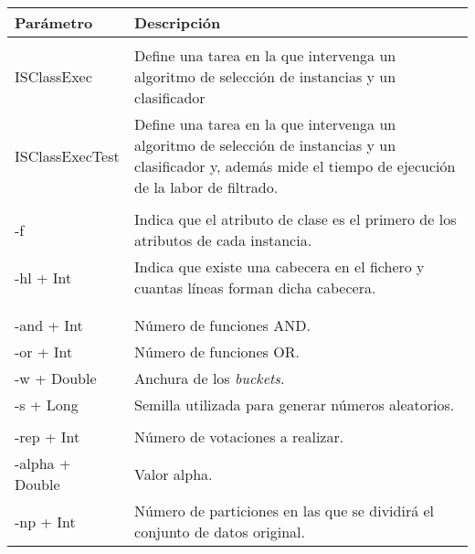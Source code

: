  \begin{table}
  \begin{center}
   \begin{tabular}{| m{3cm} | L{9cm} |}
    \hline
    \centering Parámetro &  Descripción \\
    \hline
     \\
    \hline
   	\centering ISClassExec & Define una tarea en la que intervenga un algoritmo de selección de instancias y un clasificador \\
   	\hline
   	\centering ISClassExecTest & Define una tarea en la que intervenga un algoritmo de selección de instancias y un clasificador y, además mide el tiempo de ejecución de la labor de filtrado.\\
   	\hline
   	 \\
   	\hline
   	\centering -f & Indica que el atributo de clase es el primero de los atributos de cada instancia.\\
   	\hline
   	\centering -hl + Int & Indica que existe una cabecera en el fichero y cuantas líneas forman dicha cabecera. \\
   	\hline
   	 \\
   	\hline
   	 \\
   	\hline
   	\centering -and + Int & Número de funciones AND.\\
   	\hline
   	\centering -or + Int & Número de funciones OR.\\
   	\hline
   	\centering -w + Double & Anchura de los \textit{buckets}.\\
   	\hline
   	\centering -s + Long & Semilla utilizada para generar números aleatorios.\\
   	\hline
   	 \\
   	\hline
   	\centering -rep + Int & Número de votaciones a realizar.\\
   	\hline
   	\centering -alpha +  Double & Valor alpha.\\
   	\hline
   	\centering -np +  Int & Número de particiones en las que se dividirá el conjunto de datos original. \\

\end{tabular}
\end{center}
\end{table}
